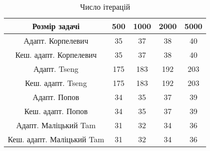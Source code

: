 \begin{table}[H]
	\centering
	\begin{tabular}{|c||c|c|c|c|}\hline
		Розмір задачі & 500 & 1000 & 2000 & 5000 \\ \hline \hline
		Адапт. Корпелевич & 35 & 37 & 38 & 40 \\ \hline
		Кеш. адапт. Корпелевич & 35 & 37 & 38 & 40 \\ \hline
		Адапт. Tseng & 175 & 183 & 192 & 203 \\ \hline
		Кеш. адапт. Tseng & 175 & 183 & 192 & 203 \\ \hline
		Адапт. Попов & 34 & 35 & 37 & 39 \\ \hline
		Кеш. адапт. Попов & 34 & 35 & 37 & 39 \\ \hline
		Адапт. Маліцький Tam & 31 & 32 & 34 & 36 \\ \hline
		Кеш. адапт. Маліцький Tam & 31 & 32 & 34 & 36 \\ \hline
	\end{tabular}
	\caption{Число ітерацій}
\end{table}
